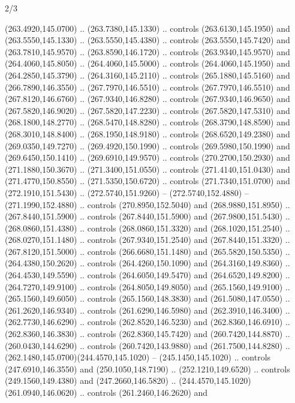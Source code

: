\begin{flagdescription}{2/3}
\begin{scope}[xshift=0.5\flaglength,yshift=0.5\flagwidth,scale=\flagwidth/259.2]
\begin{scope}[y=0.8pt, x=0.8pt, yscale=-1,shift={(-243,-162)}]
      (263.4920,145.0700) .. (263.7380,145.1330) .. controls (263.6130,145.1950) and
      (263.5550,145.1330) .. (263.5550,145.4380) .. controls (263.5550,145.7420) and
      (263.7810,145.9570) .. (263.8590,146.1720) .. controls (263.9340,145.9570) and
      (264.4060,145.8050) .. (264.4060,145.5000) .. controls (264.4060,145.1950) and
      (264.2850,145.3790) .. (264.3160,145.2110) .. controls (265.1880,145.5160) and
      (266.7890,146.3550) .. (267.7970,146.5510) .. controls (267.7970,146.5510) and
      (267.8120,146.6760) .. (267.9340,146.8280) .. controls (267.9340,146.9650) and
      (267.5820,146.9020) .. (267.5820,147.2230) .. controls (267.5820,147.5310) and
      (268.1800,148.2770) .. (268.5470,148.8280) .. controls (268.3790,148.8590) and
      (268.3010,148.8400) .. (268.1950,148.9180) .. controls (268.6520,149.2380) and
      (269.0350,149.7270) .. (269.4920,150.1990) .. controls (269.5980,150.1990) and
      (269.6450,150.1410) .. (269.6910,149.9570) .. controls (270.2700,150.2930) and
      (271.1880,150.3670) .. (271.3400,151.0550) .. controls (271.4140,151.0430) and
      (271.4770,150.8550) .. (271.5350,150.6720) .. controls (271.7340,151.0700) and
      (272.1910,151.5430) .. (272.5740,151.9260) -- (272.5740,152.4880) --
      (271.1990,152.4880) .. controls (270.8950,152.5040) and (268.9880,151.8950) ..
      (267.8440,151.5900) .. controls (267.8440,151.5900) and (267.9800,151.5430) ..
      (268.0860,151.4380) .. controls (268.0860,151.3320) and (268.1020,151.2540) ..
      (268.0270,151.1480) .. controls (267.9340,151.2540) and (267.8440,151.3320) ..
      (267.8120,151.5000) .. controls (266.6680,151.1480) and (265.5820,150.5350) ..
      (264.4380,150.2620) .. controls (264.4260,150.1090) and (264.3160,149.8360) ..
      (264.4530,149.5590) .. controls (264.6050,149.5470) and (264.6520,149.8200) ..
      (264.7270,149.9100) .. controls (264.8050,149.8050) and (265.1560,149.9100) ..
      (265.1560,149.6050) .. controls (265.1560,148.3830) and (261.5080,147.0550) ..
      (261.2620,146.9340) .. controls (261.6290,146.5980) and (262.3910,146.3400) ..
      (262.7730,146.6290) .. controls (262.8520,146.5230) and (262.8360,146.6910) ..
      (262.8360,146.3830) .. controls (262.8360,145.7420) and (260.7420,144.8870) ..
      (260.0430,144.6290) .. controls (260.7420,143.9880) and (261.7500,144.8280) ..
      (262.1480,145.0700)(244.4570,145.1020) -- (245.1450,145.1020) .. controls
      (247.6910,146.3550) and (250.1050,148.7190) .. (252.1210,149.6520) .. controls
      (249.1560,149.4380) and (247.2660,146.5820) ..
      (244.4570,145.1020)(261.0940,146.0620) .. controls (261.2460,146.2620) and

\end{scope}
\end{scope}
\end{flagdescription}
